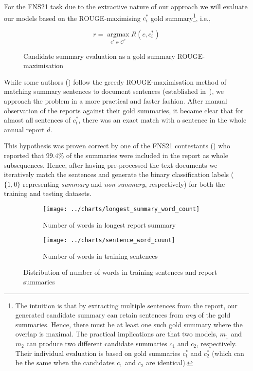 For the FNS21 task due to the extractive nature of our approach we will evaluate our models based on the ROUGE-maximising $c^{*}_{i}$ gold summary\footnote{
    The intuition is that by extracting multiple sentences from the report, our generated candidate summary can retain sentences from \emph{any} of the gold summaries. 
    Hence, there must be at least one such gold summary where the overlap is maximal.
    The practical implications are that two models, $m_{1}$ and $m_{2}$ can produce two different candidate summaries $c_{1}$ and $c_{2}$, respectively.
    Their individual evaluation is based on gold summaries $c^{*}_{1}$ and $c^{*}_{2}$ (which can be the same when the candidates $c_{1}$ and $c_{2}$ are identical).
}, i.e.,

\begin{figure}[h]
    \centering
    \begin{equation}\label{eq:rouge_max}
        r = \underset{c^{*} \in C^{*}}{\operatorname{argmax}} R(c, c^{*}_{i})
    \end{equation}
    \caption{Candidate summary evaluation as a gold summary ROUGE-maximisation}
    \label{fig:rouge_max}
\end{figure}


While some authors (\cite{zmandar-etal-2021-joint}) follow the greedy ROUGE-maximisation method of matching summary sentences to document sentences (established in~\cite{nallapati2017summarunner}), we approach the problem in a more practical and faster fashion.
After manual observation of the reports against their gold summaries, it became clear that for almost all sentences of $c^{*}_{i}$, there was an exact match with a sentence in the whole annual report $d$.

This hypothesis was proven correct by one of the FNS21 contestants (\cite{orzhenovskii-2021-t5}) who reported that 99.4\% of the summaries were included in the
report as whole subsequences.
Hence, after having pre-processed the text documents we iteratively match the sentences and generate the binary classification labels ($\{1,0\}$ representing \emph{summary} and \emph{non-summary}, respectively) for both the training and testing datasets.

\begin{figure}[ht]
    \begin{subfigure}{0.49\textwidth}
        \centering        \texttt{[image: ../charts/longest\_summary\_word\_count]}
        \caption{Number of words in longest report summary}
        \label{fig:longest_summary_word_count}
    \end{subfigure}%
    \hfill
    \begin{subfigure}{0.49\textwidth}
        \centering
        \texttt{[image: ../charts/sentence\_word\_count]}
        \caption{Number of words in training sentences}
        \label{fig:sentence_word_count}
    \end{subfigure}
    \caption{Distribution of number of words in training sentences and report summaries}
    \label{fig:word_count}
\end{figure}